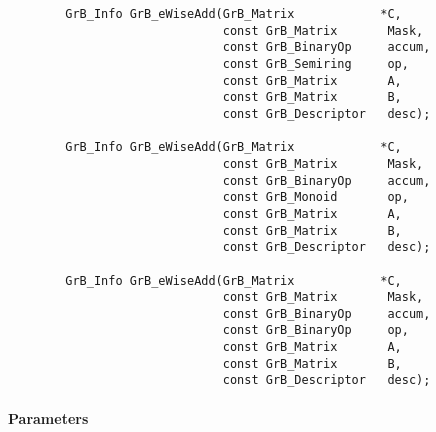 \begin{verbatim}
        GrB_Info GrB_eWiseAdd(GrB_Matrix            *C,
                              const GrB_Matrix       Mask,
                              const GrB_BinaryOp     accum,
                              const GrB_Semiring     op, 
                              const GrB_Matrix       A,
                              const GrB_Matrix       B,
                              const GrB_Descriptor   desc);
                            
        GrB_Info GrB_eWiseAdd(GrB_Matrix            *C,
                              const GrB_Matrix       Mask,
                              const GrB_BinaryOp     accum,
                              const GrB_Monoid       op, 
                              const GrB_Matrix       A,
                              const GrB_Matrix       B,
                              const GrB_Descriptor   desc);
                            
        GrB_Info GrB_eWiseAdd(GrB_Matrix            *C,
                              const GrB_Matrix       Mask,
                              const GrB_BinaryOp     accum,
                              const GrB_BinaryOp     op, 
                              const GrB_Matrix       A,
                              const GrB_Matrix       B,
                              const GrB_Descriptor   desc);
\end{verbatim}

\paragraph{Parameters}

